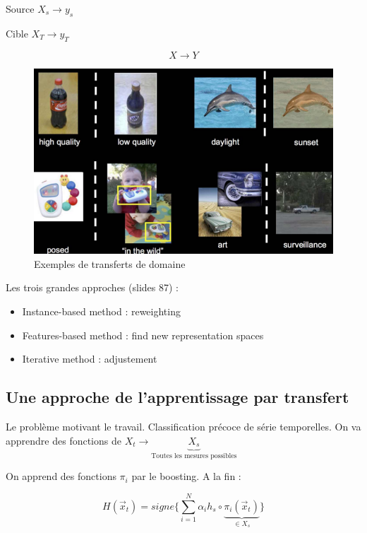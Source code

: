 \documentclass{article}
\begin{document}
\begin{center} Source $X_s \rightarrow y_s $ \end{center}
\begin{center} Cible $X_T \rightarrow y_T $ \end{center}
$$ X \rightarrow Y $$

\begin{figure}[H]
  \centering
  \includegraphics[scale=0.4]{domain_transfer.png}
  \caption{Exemples de transferts de domaine}
\end{figure}

Les trois grandes approches (slides 87) :

\begin{itemize}
\item Instance-based method : reweighting
\item Features-based method : find new representation spaces
\item Iterative method : adjustement
\end{itemize} 

\subsection{Une approche de l'apprentissage par transfert}

Le problème motivant le travail.
Classification précoce de série temporelles.
On va apprendre des fonctions de $ X_t \rightarrow \underbrace{X_s}_{\text{Toutes les mesures possibles}} $

On apprend des fonctions $\pi_i$ par le boosting. A la fin :

$$ H(\vec{x}_t) = signe \bigg\{ \sum_{i=1}^N \alpha_i h_s \circ \underbrace{\pi_i(\vec{x}_t)}_{\in X_s} \bigg\} $$
\end{document}
